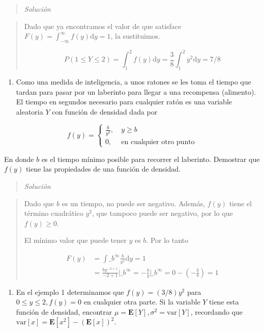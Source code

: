 \documentclass[
  letterpaper,
  DIV=11,
  numbers=noendperiod]{scrartcl}
\providecommand{\tightlist}{%
  \setlength{\itemsep}{0pt}\setlength{\parskip}{0pt}}\usepackage{longtable,booktabs,array}
\begin{document}
\begin{quote}
\emph{Solución}
\end{quote}

\begin{quote}
Dado que ya encontramos el valor de que satisface
\(F(y) = \int_{-\infty}^\infty f(y)\text{d}y = 1\), la sustituimos.

\[
 P(1\leq Y \leq 2) = \int_1^2 f(y)\text{d}y= \frac{3}{8}\int_1^2 y^2\text{d}y=7/8
\]
\end{quote}

\begin{enumerate}
\def\labelenumi{\arabic{enumi}.}
\setcounter{enumi}{2}
\tightlist
\item
  Como una medida de inteligencia, a unos ratones se les toma el tiempo
  que tardan para pasar por un laberinto para llegar a una recompensa
  (alimento). El tiempo en segundos necesario para cualquier ratón es
  una variable aleatoria \(Y\) con función de densidad dada por
\end{enumerate}

\[
  f(y) = \begin{cases}
    \frac{b}{y^2},\ &y\geq b\\
    0,\ &\text{en cualquier otro punto}
  \end{cases}
\]

En donde \(b\) es el tiempo mínimo posible para recorrer el laberinto.
Demostrar que \(f(y)\) tiene las propiedades de una función de densidad.

\begin{quote}
\emph{Solución}
\end{quote}

\begin{quote}
Dado que \(b\) es un tiempo, no puede ser negativo. Además, \(f(y)\)
tiene el término cuadrático \(y^2\), que tampoco puede ser negativo, por
lo que \(f(y) \geq 0\).

El mínimo valor que puede tener \(y\) es \(b\). Por lo tanto

\begin{align*}
F(y) &= \int\_{b}^\infty \frac{b}{y^2}\text{d}y= 1\\  
 &= \frac{by^{-2+1}}{-2+1}\Bigg|\_b^\infty=-\frac{b}{y}\Bigg|\_b^\infty=0-\left(-\frac{b}{b}\right)=1
\end{align*}
\end{quote}

\begin{enumerate}
\def\labelenumi{\arabic{enumi}.}
\setcounter{enumi}{3}
\tightlist
\item
  En el ejemplo 1 determinamos que \(f(y)=(3/8)y^2\) para
  \(0\leq y \leq 2, f(y)=0\) en cualquier otra parte. Si la variable
  \(Y\) tiene esta función de densidad, encontrar
  \(\mu=\mathbf{E}[Y], \sigma^2=\text{var}[Y]\), recordando que
  \(\text{var}[x]=\mathbf{E}[x^2]-(\mathbf{E}[x])^2\).
\end{enumerate}
\end{document}
